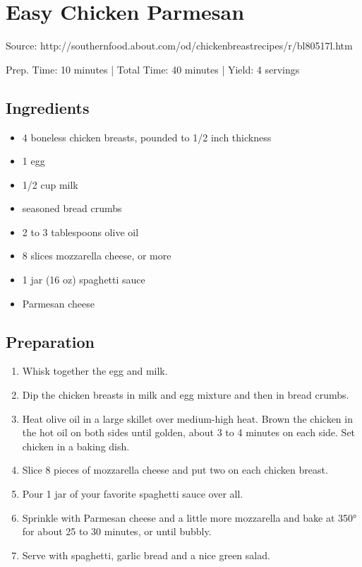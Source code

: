 \section{Easy Chicken Parmesan}

Source: http://southernfood.about.com/od/chickenbreastrecipes/r/bl80517l.htm

\begin{center}
\noindent Prep. Time: 10 minutes |
Total Time: 40 minutes | 
Yield: 4 servings
\end{center}

\subsection{Ingredients}
\begin{multicols}{2}
\begin{itemize}
    \item 4 boneless chicken breasts, pounded to 1/2 inch thickness
    \item 1 egg
    \item 1/2 cup milk
    \item seasoned bread crumbs
    \item 2 to 3 tablespoons olive oil
    \item 8 slices mozzarella cheese, or more
    \item 1 jar (16 oz) spaghetti sauce
    \item Parmesan cheese
\end{itemize}
\end{multicols}

\subsection{Preparation}
\begin{enumerate}
    \item Whisk together the egg and milk. 
    \item Dip the chicken breasts in milk and egg mixture and then in bread crumbs.
    \item Heat olive oil in a large skillet over medium-high heat. Brown the chicken in the hot oil on both sides until golden, about 3 to 4 minutes on each side. Set chicken in a baking dish.
    \item Slice 8 pieces of mozzarella cheese and put two on each chicken breast.
    \item Pour 1 jar of your favorite spaghetti sauce over all.
    \item Sprinkle with Parmesan cheese and a little more mozzarella and bake at 350° for about 25 to 30 minutes, or until bubbly.
    \item Serve with spaghetti, garlic bread and a nice green salad.
\end{enumerate}
